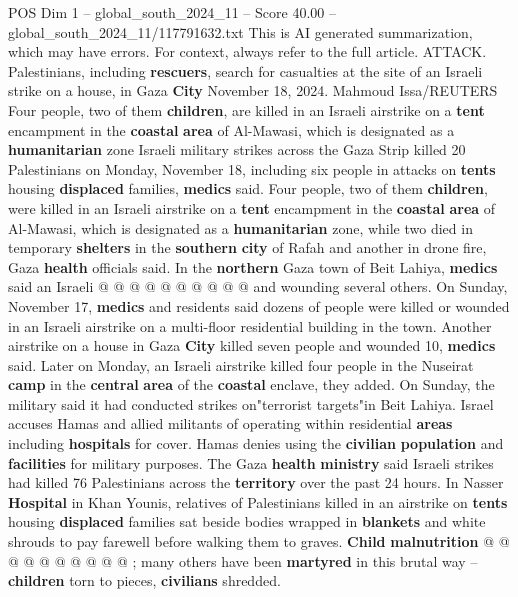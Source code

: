 \begin{textsample}{POS Dim 1 – global\_south\_2024\_11 – Score 40.00 – global\_south\_2024\_11/117791632.txt}  \label{ex:f1_pos_241}
This is AI generated summarization, which may have errors.
For context, always refer to the full article.
ATTACK.
Palestinians, including \textbf{rescuers}, search for casualties at the site of an Israeli strike on a house, in Gaza \textbf{City} November 18, 2024.
Mahmoud Issa/REUTERS Four people, two of them \textbf{children}, are killed in an Israeli airstrike on a \textbf{tent} encampment in the \textbf{coastal} \textbf{area} of Al-Mawasi, which is designated as a \textbf{humanitarian} zone Israeli military strikes across the Gaza Strip killed 20 Palestinians on Monday, November 18, including six people in attacks on \textbf{tents} housing \textbf{displaced} families, \textbf{medics} said.
Four people, two of them \textbf{children}, were killed in an Israeli airstrike on a \textbf{tent} encampment in the \textbf{coastal} \textbf{area} of Al-Mawasi, which is designated as a \textbf{humanitarian} zone, while two died in temporary \textbf{shelters} in the \textbf{southern} \textbf{city} of Rafah and another in drone fire, Gaza \textbf{health} officials said.
In the \textbf{northern} Gaza town of Beit Lahiya, \textbf{medics} said an Israeli @ @ @ @ @ @ @ @ @ @ and wounding several others.
On Sunday, November 17, \textbf{medics} and residents said dozens of people were killed or wounded in an Israeli airstrike on a multi-floor residential building in the town.
Another airstrike on a house in Gaza \textbf{City} killed seven people and wounded 10, \textbf{medics} said.
Later on Monday, an Israeli airstrike killed four people in the Nuseirat \textbf{camp} in the \textbf{central} \textbf{area} of the \textbf{coastal} enclave, they added.
On Sunday, the military said it had conducted strikes on"terrorist targets"in Beit Lahiya.
Israel accuses Hamas and allied militants of operating within residential \textbf{areas} including \textbf{hospitals} for cover.
Hamas denies using the \textbf{civilian} \textbf{population} and \textbf{facilities} for military purposes.
The Gaza \textbf{health} \textbf{ministry} said Israeli strikes had killed 76 Palestinians across the \textbf{territory} over the past 24 hours.
In Nasser \textbf{Hospital} in Khan Younis, relatives of Palestinians killed in an airstrike on \textbf{tents} housing \textbf{displaced} families sat beside bodies wrapped in \textbf{blankets} and white shrouds to pay farewell before walking them to graves. \textbf{Child} \textbf{malnutrition} @ @ @ @ @ @ @ @ @ @ ; many others have been \textbf{martyred} in this brutal way -- \textbf{children} torn to pieces, \textbf{civilians} shredded.

\end{textsample}
